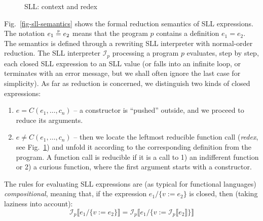 \begin{figure}[t!]
\caption{SLL: context and redex}

\label{fig-sll-context}
\end{figure}

Fig.~\ref{fig-sll-semantics} shows the formal reduction semantics of SLL expressions.
The notation $e_1 \stackrel{\textrm{\tiny p}}{=} e_2$ means that the program $p$ contains a definition $e_1 = e_2$.
The semantics is defined through a rewriting SLL interpreter with normal-order reduction.
The SLL interpreter $\mathcal{I}_p$ processing a program $p$ evaluates, step by step,
each closed SLL expression to an SLL value (or falls into an infinite loop,
or terminates with an error message, but we shall often ignore the last case for simplicity).
As far as reduction is concerned, we distinguish two kinds of closed expressions:
\begin{enumerate}
  \item $e = C(e_1, \ldots, c_n)$ -- a constructor is ``pushed'' outside, and we 
  proceed to reduce its arguments.
  \item $e \not = C(e_1, \ldots, c_n)$ -- then we locate the leftmost reducible function call
  (\emph{redex}, see Fig.~\ref{fig-sll-context}) and unfold it according to
  the corresponding definition from the program.
  A function call is reducible if it is a call to
  1) an indifferent function or
  2) a curious function, where the first argument starts with a constructor.
\end{enumerate}



The rules for evaluating SLL expressions are (as typical for functional languages) \emph{compositional},
meaning that, if the expression $e_1 / \{v := e_2\}$ is closed, then
(taking laziness into account):
\[\mathcal{I}_p\llbracket e_1 / \{v := e_2\}\rrbracket = \mathcal{I}_p \llbracket e_1 / \{v := \mathcal{I}_p\llbracket e_2\rrbracket\} \rrbracket\]

